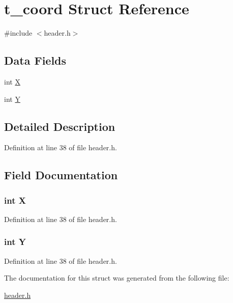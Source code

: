 \hypertarget{structt__coord}{\section{t\-\_\-coord Struct Reference}
\label{structt__coord}
}


{\ttfamily \#include $<$header.\-h$>$}

\subsection*{Data Fields}
\begin{DoxyCompactItemize}
\item 
int \hyperlink{structt__coord_a80c0944640e62d3ed6c5419c1bcc0c88}{X}
\item 
int \hyperlink{structt__coord_aa482c4cc86a24474e4fb19b5b5978778}{Y}
\end{DoxyCompactItemize}


\subsection{Detailed Description}


Definition at line 38 of file header.\-h.



\subsection{Field Documentation}
\hypertarget{structt__coord_a80c0944640e62d3ed6c5419c1bcc0c88}{
\subsubsection[{X}]{\setlength{\rightskip}{0pt plus 5cm}int X}}\label{structt__coord_a80c0944640e62d3ed6c5419c1bcc0c88}


Definition at line 38 of file header.\-h.

\hypertarget{structt__coord_aa482c4cc86a24474e4fb19b5b5978778}{
\subsubsection[{Y}]{\setlength{\rightskip}{0pt plus 5cm}int Y}}\label{structt__coord_aa482c4cc86a24474e4fb19b5b5978778}


Definition at line 38 of file header.\-h.



The documentation for this struct was generated from the following file\-:\begin{DoxyCompactItemize}
\item 
\hyperlink{header_8h}{header.\-h}\end{DoxyCompactItemize}
